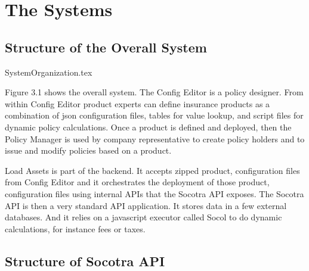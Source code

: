 \chapter{The Systems}
\label{intro04} %


\section{Structure of the Overall System}
\label{sec:03:1}

{SystemOrganization.tex}

Figure 3.1 shows the overall system. The Config Editor is a policy designer. From within Config
Editor product experts can define insurance products as a combination of json configuration
files, tables for value lookup, and script files for dynamic policy calculations. Once a product
is defined and deployed, then the Policy Manager is used by company representative to create
policy holders and to issue and modify policies based on a product.

Load Assets is part of the backend. It accepts zipped product, configuration files from Config Editor and
it orchestrates the deployment of those product, configuration files using internal APIs that the
Socotra API exposes. The Socotra API is then a very standard API application. It stores data in
a few external databases. And it relies on a javascript executor called Socol to do dynamic calculations,
for instance fees or taxes.

\section{Structure of Socotra API}

